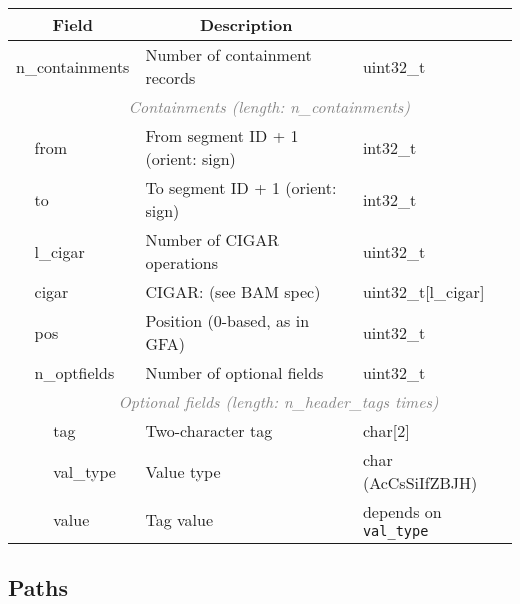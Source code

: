 \documentclass[12pt]{article}
\begin{document}
\begin{tabular}{|ll|>{\sffamily}l|p{6.5cm}|>{\ttfamily}l|}
\hline
\multicolumn{3}{|c|}{\textbf{Field}} &
\multicolumn{1}{c|}{\textbf{Description}} &
\multicolumn{1}{c|}{\textbf{Type}} \\
\hline
\multicolumn{3}{|l|}{\sf n\_containments}
& Number of containment records & uint32\_t \\
\hline
\multicolumn{1}{|l}{} &
\multicolumn{4}{c|}{\textcolor{gray}{\textit{Containments (length:
n\_containments)}}}\\
\cline{2-5}
& \multicolumn{2}{|l|}{\sf from} & From segment ID + 1 (orient: sign) & int32\_t \\
\cline{2-5}
& \multicolumn{2}{|l|}{\sf to} & To segment ID + 1 (orient: sign) & int32\_t \\
\cline{2-5}
& \multicolumn{2}{|l|}{\sf l\_cigar} &
Number of CIGAR operations & uint32\_t \\
\cline{2-5}
& \multicolumn{2}{|l|}{\sf cigar} &
CIGAR: (see BAM spec) & uint32\_t[l\_cigar] \\
\cline{2-5}
& \multicolumn{2}{|l|}{\sf pos} &
Position (0-based, as in GFA) & uint32\_t \\
\cline{2-5}
& \multicolumn{2}{|l|}{\sf n\_optfields}
  & Number of optional fields & uint32\_t \\
\cline{2-5}
\multicolumn{2}{|l}{} &
\multicolumn{3}{c|}{\textcolor{gray}{\textit{Optional fields
(length: n\_header\_tags times)}}}\\
\cline{3-5}
& & tag & Two-character tag & char[2] \\
\cline{3-5}
& & val\_type & Value type & char (AcCsSiIfZBJH) \\
\cline{3-5}
& & value & Tag value &
depends on {\tt val\_type} \\
\hline
\end{tabular}

\subsection*{Paths}
\vspace{0.5cm}
\end{document}
